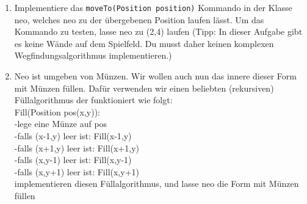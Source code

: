 
\begin{enumerate}
\item Implementiere das \lstinline{moveTo(Position position)} Kommando in der Klasse neo, welches neo zu der übergebenen Position laufen lässt. Um das Kommando zu testen, lasse neo zu (2,4) laufen (Tipp: In dieser Aufgabe gibt es keine Wände auf dem Spielfeld. Du musst daher keinen komplexen Wegfindungsalgorithmus implementieren.)
\item Neo ist umgeben von Münzen. Wir wollen auch nun das innere dieser Form mit Münzen füllen. Dafür verwenden wir einen beliebten (rekursiven) Füllalgorithmus der funktioniert wie folgt:\\
Fill(Position pos(x,y)):\\
-lege eine Münze auf pos\\
-falls (x-1,y) leer ist: Fill(x-1,y)\\
-falls (x+1,y) leer ist: Fill(x+1,y)\\
-falls (x,y-1) leer ist: Fill(x,y-1)\\
-falls (x,y+1) leer ist: Fill(x,y+1)\\

implementieren diesen Füllalgorithmus, und lasse neo die Form mit Münzen füllen
\end{enumerate}
